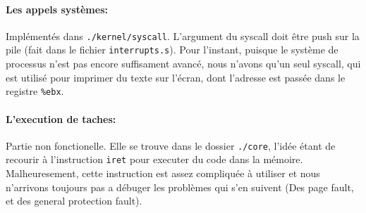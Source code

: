 \documentclass[12pt,a4paper]{article}
\begin{document}
\paragraph{Les appels systèmes:} 
    Implémentés dans \texttt{./kernel/syscall}. L'argument du syscall doit être push sur la pile (fait dans le fichier \texttt{interrupts.s}). Pour l'instant, puisque le système de processus n'est pas encore suffisament avancé, nous n'avons qu'un seul syscall, qui est utilisé pour imprimer du texte sur l'écran, dont l'adresse est passée dans le registre \texttt{\%ebx}.


\paragraph{L'execution de taches:}
    Partie non fonctionelle.
    Elle se trouve dans le dossier \texttt{./core}, l'idée étant de recourir à l'instruction \texttt{iret} pour executer du code dans la mémoire.
    Malheuresement, cette instruction est assez compliquée à utiliser et nous n'arrivons toujours pas a débuger les problèmes qui s'en suivent (Des page fault, et des general protection fault).
\end{document}

